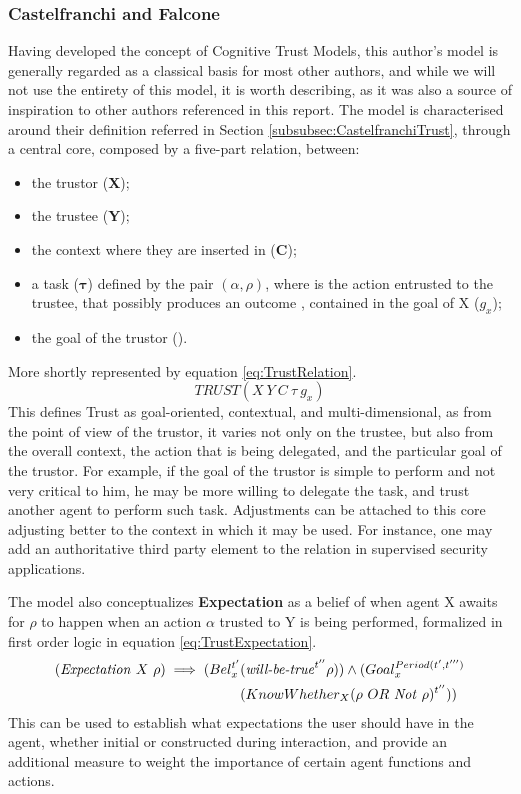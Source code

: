 \subsubsection{Castelfranchi and Falcone}
Having developed the concept of Cognitive Trust Models, this author's model is generally regarded as a classical basis for most other authors, and while we will not use the entirety of this model, it is worth describing, as it was also a source of inspiration to other authors referenced in this report. 
The model is characterised around their definition referred in Section \ref{subsubsec:CastelfranchiTrust}, through a central core, composed by a five-part relation, between:
\begin{itemize}
	\item the trustor (\textbf{X});
	\item the trustee (\textbf{Y});
	\item the context where they are inserted in (\textbf{C});
	\item a task ($\bm{\tau}$) defined by the pair $(\alpha, \rho)$, where \bm{$\alpha$} is the action  entrusted to the trustee, that possibly produces an outcome \bm{$\rho$}, contained in the goal of X ($g_x$);
	\item the goal of the trustor ().
\end{itemize}
More shortly represented by equation \ref{eq:TrustRelation}.
\begin{equation}
TRUST(X\ Y\ C\ \tau\ g_x)
\label{eq:TrustRelation}
\end{equation}
This defines Trust as goal-oriented, contextual, and multi-dimensional, as from the point of view of the trustor, it varies not only on the trustee, but also from the overall context, the action that is being delegated, and the particular goal of the trustor. For example, if the goal of the trustor is simple to perform and not very critical to him, he may be more willing to delegate the task, and trust another agent to perform such task. Adjustments can be attached to this core adjusting better to the context in which it may be used. For instance, one may add an authoritative third party element to the relation in supervised security applications.

The model also conceptualizes \textbf{Expectation} as a belief of when agent X awaits for $\rho$ to happen when an action $\alpha$ trusted to Y is being performed, formalized in first order logic in equation \ref{eq:TrustExpectation}.
\begin{equation}
	\begin{aligned}
		(\text{\textit{Expectation}}\ X\ \rho) \implies (Bel_x^{t'} &(\text{\textit{will-be-true}} ^ {t''} \rho)) \wedge (Goal_x^{Period(t', t''')} \\
														&(KnowWhether_X (\rho\ OR\ \text{\textit{Not} } \rho)^{t''}))
	\end{aligned}
	\label{eq:TrustExpectation}
\end{equation}
This can be used to establish what expectations the user should have in the agent, whether initial or constructed during interaction, and provide an additional measure to weight the importance of certain agent functions and actions.

